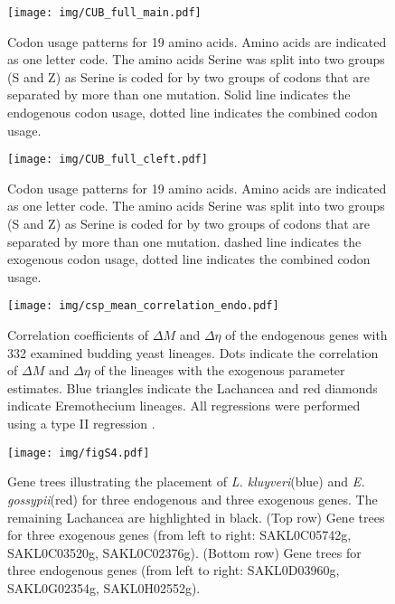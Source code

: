 \documentclass[doublespacing,linenumbers]{bmcart}
\newcommand{\kluyveri}{\textit{L. kluyveri}\xspace}
\newcommand{\gossypii}{\textit{E. gossypii}\xspace}
\newcommand{\DM}{\ensuremath{{\Delta M}}\xspace}
\newcommand{\DE}{\ensuremath{{\Delta \eta}}\xspace}
\begin{document}
\begin{backmatter}
\begin{figure}
     \centering
	\texttt{[image: img/CUB\_full\_main.pdf]}
	\caption{Codon usage patterns for 19 amino acids. Amino acids are indicated as one letter code. 
	The amino acids Serine was split into two groups (S and Z) as Serine is coded for by two groups of codons that are separated by more than one mutation.
	Solid line indicates the endogenous codon usage, dotted line indicates the combined codon usage.}
	\label{fig:cub_full_main}
\end{figure}
\null
\vfill
\begin{figure}
     \centering
	\texttt{[image: img/CUB\_full\_cleft.pdf]}
	\caption{Codon usage patterns for 19 amino acids. Amino acids are indicated as one letter code. 
	The amino acids Serine was split into two groups (S and Z) as Serine is coded for by two groups of codons that are separated by more than one mutation.
	dashed line indicates the exogenous codon usage, dotted line indicates the combined codon usage.}
	\label{fig:cub_full_cleft}
\end{figure}

\null
\vfill
\begin{figure}
     \centering
	\texttt{[image: img/csp\_mean\_correlation\_endo.pdf]}
	\caption{Correlation coefficients of \DM and \DE of the endogenous genes with 332 examined budding yeast lineages. 
	Dots indicate the correlation of \DM and \DE of the lineages with the exogenous parameter estimates.
	Blue triangles indicate the Lachancea and red diamonds indicate Eremothecium lineages.
	All regressions were performed using a type II regression \citep{SokalAndRohlf1981}.}
	\label{fig:csp_endo_comp}
\end{figure}
\null
\vfill
\clearpage

\null
\vfill
\begin{figure}
     \centering
	\texttt{[image: img/figS4.pdf]}
	\caption{Gene trees illustrating the placement of \kluyveri (blue) and \gossypii (red) for three endogenous and three exogenous genes. 
	The remaining Lachancea are highlighted in black. 
	(Top row)  Gene trees for three exogenous genes (from left to right: SAKL0C05742g, SAKL0C03520g, SAKL0C02376g).
	(Bottom row) Gene trees for three endogenous genes (from left to right: SAKL0D03960g, SAKL0G02354g, SAKL0H02552g).}
	\label{fig:phylo_relation}
\end{figure}
\null
\vfill
\clearpage


\end{backmatter}
\end{document}
